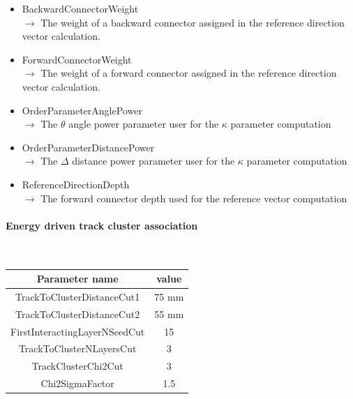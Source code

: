 \documentclass[cits]{JINST}
\begin{document}
\begin{itemize}
  \item BackwardConnectorWeight \\
  $\rightarrow$ The weight of a backward connector assigned in the reference direction vector calculation.
  \item ForwardConnectorWeight \\
  $\rightarrow$ The weight of a forward connector assigned in the reference direction vector calculation.
  \item OrderParameterAnglePower \\
  $\rightarrow$ The $\theta$ angle power parameter user for the $\kappa$ parameter computation
  \item OrderParameterDistancePower \\
  $\rightarrow$ The $\Delta$ distance power parameter user for the $\kappa$ parameter computation
  \item ReferenceDirectionDepth \\
  $\rightarrow$ The forward connector depth used for the reference vector computation
\end{itemize}


\paragraph{Energy driven track cluster association} ~

\begin{table}[!ht]
  \begin{center}
    \begin{tabu} to \linewidth { c | c } 
          Parameter name & value \\
          \hline
          TrackToClusterDistanceCut1 & 75 mm \\
          TrackToClusterDistanceCut2 & 55 mm \\
          FirstInteractingLayerNSeedCut & 15 \\
          TrackToClusterNLayersCut & 3 \\
          TrackClusterChi2Cut & 3 \\
          Chi2SigmaFactor & 1.5
    \end{tabu} 
  \end{center}
\end{table}
\end{document}
